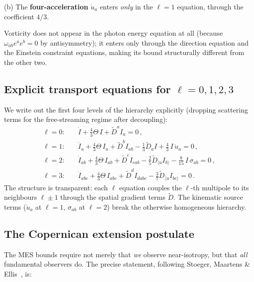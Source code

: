 (b) The \textbf{four-acceleration} $\dot{u}_a$ enters
\emph{only} in the $\ell = 1$ equation, through the coefficient
$4/3$.

Vorticity does not appear in the photon energy equation at all
(because $\omega_{ab}e^a e^b = 0$ by antisymmetry); it enters
only through the direction equation and the Einstein constraint
equations, making its bound structurally different from the
other two.


\subsection{Explicit transport equations for $\ell = 0, 1, 2, 3$}
\label{sec:transport}

We write out the first four levels of the hierarchy explicitly
(dropping scattering terms for the free-streaming regime after
decoupling):
\begin{align}
\ell = 0:\quad
& \dot{I} + \tfrac{4}{3}\Theta\,I
  + \tilde{D}^a I_a = 0\,,
  \label{eq:ell0}\\[4pt]
\ell = 1:\quad
& \dot{I}_a + \tfrac{4}{3}\Theta\,I_a
  + \tilde{D}^b I_{ab}
  - \tfrac{1}{3}\tilde{D}_a I
  + \tfrac{4}{3}\,I\,\dot{u}_a = 0\,,
  \label{eq:ell1}\\[4pt]
\ell = 2:\quad
& \dot{I}_{ab} + \tfrac{4}{3}\Theta\,I_{ab}
  + \tilde{D}^c I_{cab}
  - \tfrac{2}{5}\tilde{D}_{\langle a} I_{b\rangle}
  - \tfrac{8}{15}\,I\,\sigma_{ab} = 0\,,
  \label{eq:ell2}\\[4pt]
\ell = 3:\quad
& \dot{I}_{abc} + \tfrac{4}{3}\Theta\,I_{abc}
  + \tilde{D}^d I_{dabc}
  - \tfrac{3}{7}\tilde{D}_{\langle a} I_{bc\rangle}
  = 0\,.
  \label{eq:ell3}
\end{align}
The structure is transparent: each $\ell$ equation couples the
$\ell$-th multipole to its neighbours $\ell \pm 1$ through the
spatial gradient terms $\tilde{D}$.  The kinematic source terms
($\dot{u}_a$ at $\ell = 1$, $\sigma_{ab}$ at $\ell = 2$) break
the otherwise homogeneous hierarchy.


\subsection{The Copernican extension postulate}
\label{sec:copernican}

The MES bounds require not merely that \emph{we} observe
near-isotropy, but that \emph{all} fundamental observers do.
The precise statement, following Stoeger, Maartens \&
Ellis~\cite{StoegerME1995}, is:

